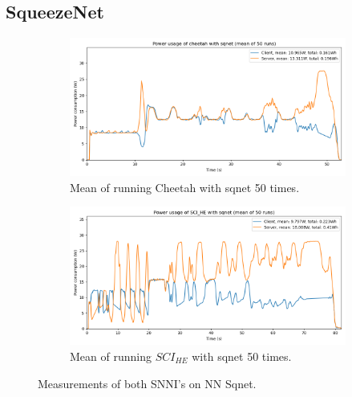 \documentclass[../thesis.tex]{subfiles}
\begin{document}
\subsection{SqueezeNet}\label{subsection:sqnet}
\begin{figure}[th!]
    \begin{subfigure}{.75\linewidth}
            \includegraphics[width=\textwidth]{Thesis/Images/Means/mean_cheetah-sqnet.png}
            \caption{Mean of running Cheetah with sqnet 50 times.}
            \label{fig:mean_cheetah_sqnet}
    \end{subfigure}
    \medskip
    \begin{subfigure}{.75\linewidth}
            \includegraphics[width=\textwidth]{Thesis/Images/Means/mean_SCI_HE-sqnet.png}
            \caption{Mean of running $SCI_{HE}$ with sqnet 50 times.}
            \label{fig:mean_SCI_HE_sqnet}
    \end{subfigure}

    \caption{Measurements of both SNNI's on NN Sqnet.}
\end{figure}
\end{document}
